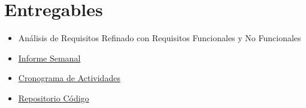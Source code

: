 \section{Entregables}

\begin{itemize}

	\item Análisis de Requisitos Refinado con Requisitos Funcionales y No Funcionales

	\item \href{https://github.com/smonsalve/Epi/blob/master/informes/Semana2/Informe2.pdf}{Informe Semanal}

	\item \href{https://github.com/smonsalve/Epi/blob/master/doc/Cronograma.md} {Cronograma de Actividades}

	\item \href{https://github.com/smonsalve/Epi}{Repositorio Código}

\end{itemize}